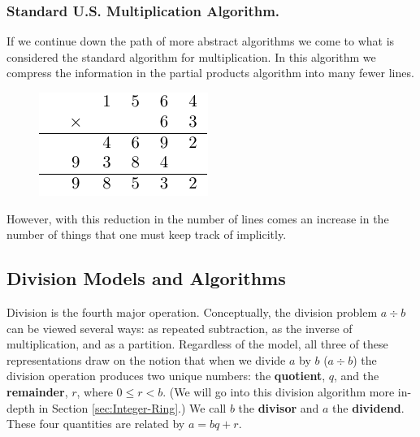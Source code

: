 \documentclass[
]{book}
\theoremstyle{definition}
\theoremstyle{definition}
\theoremstyle{definition}
\theoremstyle{remark}
\begin{document}
\hypertarget{standard-u.s.-multiplication-algorithm.}{%
\subsubsection*{Standard U.S. Multiplication Algorithm.}\label{standard-u.s.-multiplication-algorithm.}}

If we continue down the path of more abstract algorithms we come to what is considered the standard algorithm for multiplication. In this algorithm we compress the information in the partial products algorithm into many fewer lines.

\begin{figure}

{\centering \includegraphics[width=0.6\linewidth]{tikz/multiplication-algorithm-standard} 

}

\end{figure}

However, with this reduction in the number of lines comes an increase in the number of things that one must keep track of implicitly.

\hypertarget{division-models-and-algorithms}{%
\subsection{Division Models and Algorithms}\label{division-models-and-algorithms}}

Division is the fourth major operation. Conceptually, the division problem \(a \div b\) can be viewed several ways: as repeated subtraction, as the inverse of multiplication, and as a partition. Regardless of the model, all three of these representations draw on the notion that when we divide \(a\) by \(b\) (\(a\div b\)) the division operation produces two unique numbers: the \textbf{quotient}, \(q\), and the \textbf{remainder}, \(r\), where \(0\leq r <b\). (We will go into this division algorithm more in-depth in Section \ref{sec:Integer-Ring}.) We call \(b\) the \textbf{divisor} and \(a\) the \textbf{dividend}. These four quantities are related by \(a=bq+r\).
\end{document}
